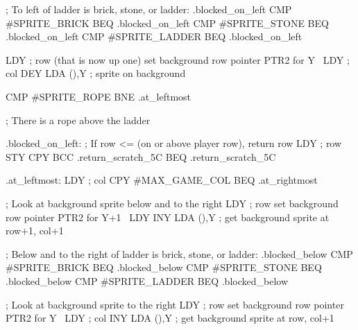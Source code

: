 \documentclass[10pt]{report}%
\begin{document}
    ; To left of ladder is brick, stone, or ladder: .blocked_on_left
    CMP     #SPRITE_BRICK
    BEQ     .blocked_on_left
    CMP     #SPRITE_STONE
    BEQ     .blocked_on_left
    CMP     #SPRITE_LADDER
    BEQ     .blocked_on_left

    LDY          ; row (that is now up one)
    \LA{}set background row pointer \code{}PTR2\edoc{} for \code{}Y\edoc{}~{\nwtagstyle{}}\RA{}
    LDY          ; col
    DEY
    LDA     (),Y    ; sprite on background

    CMP     #SPRITE_ROPE
    BNE     .at_leftmost

    ; There is a rope above the ladder

.blocked_on_left:
    ; If row <=  (on or above player row), return row
    LDY          ; row
    STY     
    CPY     
    BCC     .return_scratch_5C
    BEQ     .return_scratch_5C

.at_leftmost:
    LDY          ; col
    CPY     #MAX_GAME_COL
    BEQ     .at_rightmost

    ; Look at background sprite below and to the right
    LDY          ; row
    \LA{}set background row pointer \code{}PTR2\edoc{} for \code{}Y+1\edoc{}~{\nwtagstyle{}}\RA{}
    LDY     
    INY
    LDA     (),Y        ; get background sprite at row+1, col+1

    ; Below and to the right of ladder is brick, stone, or ladder: .blocked_below
    CMP     #SPRITE_BRICK
    BEQ     .blocked_below
    CMP     #SPRITE_STONE
    BEQ     .blocked_below
    CMP     #SPRITE_LADDER
    BEQ     .blocked_below

    ; Look at background sprite to the right
    LDY          ; row
    \LA{}set background row pointer \code{}PTR2\edoc{} for \code{}Y\edoc{}~{\nwtagstyle{}}\RA{}
    LDY          ; col
    INY
    LDA     (),Y    ; get background sprite at row, col+1
\end{document}
